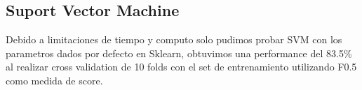 \begin{enumerate}
\subsection{Suport Vector Machine}

Debido a limitaciones de tiempo y computo solo pudimos probar SVM con los parametros dados por defecto en Sklearn, obtuvimos una performance del 83.5\% al realizar cross validation de 10 folds con el set de entrenamiento utilizando F0.5 como medida de score.

\end{enumerate}
